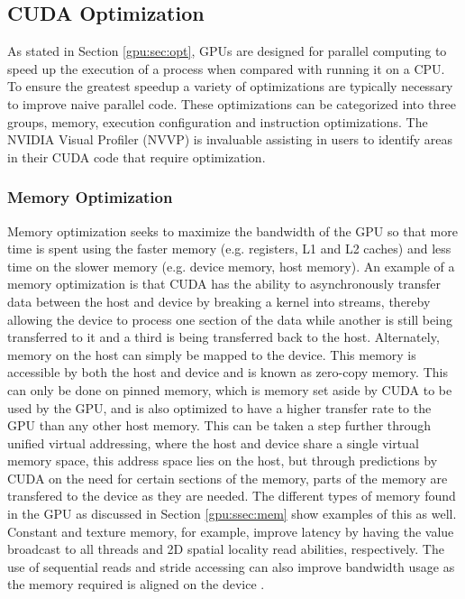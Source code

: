 \subsection{CUDA Optimization}\label{gpu:sec:cop}
As stated in Section \ref{gpu:sec:opt}, GPUs are designed for parallel computing to speed up the execution of a process when compared with running it on a CPU. To ensure the greatest speedup a variety of optimizations are typically necessary to improve naive parallel code. These optimizations can be categorized into three groups, memory, execution configuration and instruction optimizations. The NVIDIA Visual Profiler (NVVP) is invaluable assisting in users to identify areas in their CUDA code that require optimization.
\subsubsection{Memory Optimization}
Memory optimization seeks to maximize the bandwidth of the GPU so that more time is spent using the faster memory (e.g. registers, L1 and L2 caches) and less time on the slower memory (e.g. device memory, host memory). An example of a memory optimization is that CUDA has the ability to asynchronously transfer data between the host and device by breaking a kernel into streams, thereby allowing the device to process one section of the data while another is still being transferred to it and a third is being transferred back to the host. Alternately, memory on the host can simply be mapped to the device. This memory is accessible by both the host and device and is known as zero-copy memory. This can only be done on pinned memory, which is memory set aside by CUDA to be used by the GPU, and is also optimized to have a higher transfer rate to the GPU than any other host memory. This can be taken a step further through unified virtual addressing, where the host and device share a single virtual memory space, this address space lies on the host, but through predictions by CUDA on the need for certain sections of the memory, parts of the memory are transfered to the device as they are needed. The different types of memory found in the GPU as discussed in Section \ref{gpu:ssec:mem} show examples of this as well. Constant and texture memory, for example, improve latency by having the value broadcast to all threads and 2D spatial locality read abilities, respectively. The use of sequential reads and stride accessing can also improve bandwidth usage as the memory required is aligned on the device \citep{CUDA}.
%
